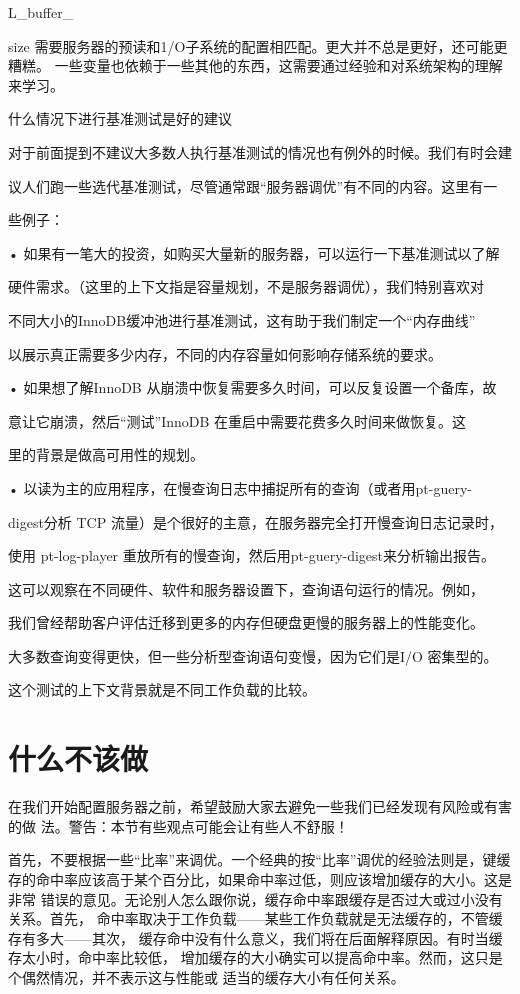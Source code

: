 L\_buffer\_

size 需要服务器的预读和1/O子系统的配置相匹配。更大并不总是更好，还可能更糟糕。
一些变量也依赖于一些其他的东西，这需要通过经验和对系统架构的理解来学习。

什么情况下进行基准测试是好的建议

对于前面提到不建议大多数人执行基准测试的情况也有例外的时候。我们有时会建

议人们跑一些选代基准测试，尽管通常跟“服务器调优”有不同的内容。这里有一

些例子：

• 如果有一笔大的投资，如购买大量新的服务器，可以运行一下基准测试以了解

硬件需求。（这里的上下文指是容量规划，不是服务器调优），我们特别喜欢对

不同大小的InnoDB缓冲池进行基准测试，这有助于我们制定一个“内存曲线”

以展示真正需要多少内存，不同的内存容量如何影响存储系统的要求。

• 如果想了解InnoDB 从崩溃中恢复需要多久时间，可以反复设置一个备库，故

意让它崩溃，然后“测试”InnoDB 在重启中需要花费多久时间来做恢复。这

里的背景是做高可用性的规划。

• 以读为主的应用程序，在慢查询日志中捕捉所有的查询（或者用pt-guery-

digest分析 TCP 流量）是个很好的主意，在服务器完全打开慢查询日志记录时，

使用 pt-log-player 重放所有的慢查询，然后用pt-guery-digest来分析输出报告。

这可以观察在不同硬件、软件和服务器设置下，查询语句运行的情况。例如，

我们曾经帮助客户评估迁移到更多的内存但硬盘更慢的服务器上的性能变化。

大多数查询变得更快，但一些分析型查询语句变慢，因为它们是I/O 密集型的。

这个测试的上下文背景就是不同工作负载的比较。

\section{什么不该做}
在我们开始配置服务器之前，希望鼓励大家去避免一些我们已经发现有风险或有害的做
法。警告：本节有些观点可能会让有些人不舒服！

首先，不要根据一些“比率”来调优。一个经典的按“比率”调优的经验法则是，键缓
存的命中率应该高于某个百分比，如果命中率过低，则应该增加缓存的大小。这是非常
错误的意见。无论别人怎么跟你说，缓存命中率跟缓存是否过大或过小没有关系。首先，
命中率取决于工作负载——某些工作负载就是无法缓存的，不管缓存有多大——其次，
缓存命中没有什么意义，我们将在后面解释原因。有时当缓存太小时，命中率比较低，
增加缓存的大小确实可以提高命中率。然而，这只是个偶然情况，并不表示这与性能或
适当的缓存大小有任何关系。

